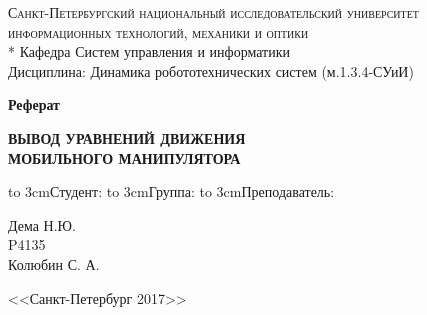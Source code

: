 \begin{titlepage}

\begin{center}
\textsc{Санкт-Петербургский национальный исследовательский университет 
                информационных технологий, механики и оптики} \\*
\vspace{0.5cm}
Кафедра Систем управления и информатики \\     

\vspace{0.5cm}
Дисциплина: Динамика робототехнических систем (м.1.3.4-СУиИ)\\     
\end{center}

\vspace{4cm}


\vspace{0.3cm}

\begin{center}
\large{\textbf{Реферат}}
\end{center}
\begin{center}
\large{\textbf{ВЫВОД УРАВНЕНИЙ ДВИЖЕНИЯ\\ МОБИЛЬНОГО МАНИПУЛЯТОРА}}
\end{center}
\vspace{1cm}



\vspace{4.5cm}

{\small
\begin{flushright}
\parbox{4cm}{\hbox to 3cm{Студент:\hfill} 
			 \hbox to 3cm{Группа:\hfill}
			 \hbox to 3cm{Преподаватель:\hfill}}
\parbox{4cm}{Дема Н.Ю.\\
			 P4135\\
			 Колюбин С. А.}
\end{flushright}}
\vspace{\fill}	

\begin{center}
<<Санкт-Петербург 2017>>
\end{center}

\end{titlepage}